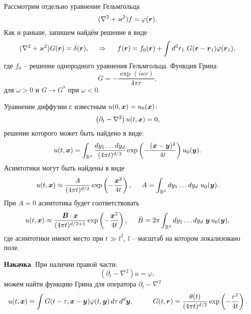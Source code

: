
Рассмотрим отдельно уравнение Гельмгольца
\begin{equation*}
    (\nabla^2 + \varkappa^2) f = \varphi(\mbox{\boldmath $r$}).
\end{equation*}
Как и раньше, запишем найдём решение в виде
\begin{equation*}
    (\nabla^2 + \varkappa^2) G(\mbox{\boldmath $r$}) = \delta(\mbox{\boldmath $r$}),
    \hspace{0.5cm} \Rightarrow \hspace{0.5cm}
    f(\mbox{\boldmath $r$}) = f_0(\mbox{\boldmath $r$}) + \int d^3 r_1 \ G(\mbox{\boldmath $r$}-\mbox{\boldmath $r$}_1) \varphi(\mbox{\boldmath $r$}_1),
\end{equation*}
где $f_0$ -- решение однородного уравнения Гельмгольца.
Функция Грина:
\begin{equation*}
    G = - \frac{\exp(i \kappa r)}{4 \pi r},
\end{equation*}
для $\omega > 0$ и $G \to G^*$ при $\omega < 0$.





Уравнение диффузии с известным $u(0, \mbox{\boldmath $x$}) = u_0 (\mbox{\boldmath $x$})$:
\begin{equation}
    \left(\partial_t - \nabla^2\right) u(t, \mbox{\boldmath $x$}) = 0,
    \label{difeq}
\end{equation}
решение которого может быть найдено в виде:
\begin{equation}
    u(t, \mbox{\boldmath $x$}) = \int_{\mathbb{R}^d} \frac{d y_1 \ldots d y_d}{(4 \pi t)^{d/2}} \exp\left(- \frac{(\mbox{\boldmath $x$}-\mbox{\boldmath $y$})^2}{4 t}\right) u_0(\mbox{\boldmath $y$}).
    \label{difsol}
\end{equation}
Асимтотики могут быть найдены в виде
\begin{equation}
    u(t, \mbox{\boldmath $x$}) \approx \frac{A}{(4 \pi t)^{d/2}} \exp\left(- \frac{\mbox{\boldmath $x$}^2}{4 t}\right),
    \hspace{5 mm} 
    A = \int_{ \mathbb{R}^d} dy_1 \ldots dy_d \ u_0(\mbox{\boldmath $y$}).
    \label{difas1}
\end{equation}
При $A = 0$ асимтотика будет соответствовать
\begin{equation}
    u(t, \mbox{\boldmath $x$}) \approx  \frac{\mbox{\boldmath $B$} \cdot \mbox{\boldmath $x$}}{(4 \pi t)^{d/2+1}} \exp\left(
        - \frac{\mbox{\boldmath $x$}^2}{4 t}
    \right), \hspace{5 mm} 
    \bar{B} = 2 \pi \int_{ \mathbb{R}^d} dy_1 \ldots dy_d \ \mbox{\boldmath $y$}\, u_0(\mbox{\boldmath $y$}),
    \label{difas2}
\end{equation}
где асимтотики имеют место при $t \gg l^2$, $l$ -- масштаб на котором локализовано поле.

\textbf{Накачка}. 
При наличии правой части:
\begin{equation*}
    (\partial_t - \nabla^2) u = \varphi,
\end{equation*}
можем найти функцию Грина для оператора $\partial_t - \nabla^2$
\begin{equation*}
    u(t, \vc{x}) =  \int G(t-\tau, \vc{x}-\vc{y}) \varphi(t, \vc{y}) \d \tau \d^d \vc{y},
    \hspace{10 mm} 
    G(t, \vc{r}) = \frac{\theta(t)}{(4 \pi t)^{d/2}} \exp\left(- \frac{r^2}{4 t}\right).
\end{equation*}
